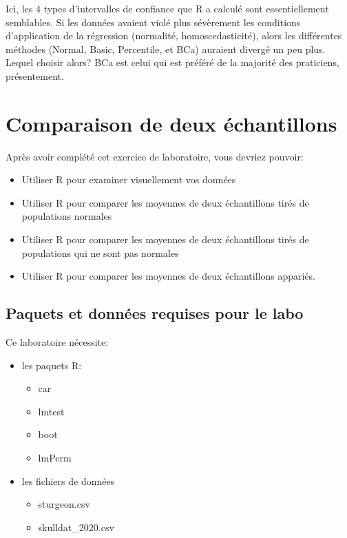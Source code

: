 \documentclass[
  12pt,
]{book}
\providecommand{\tightlist}{%
  \setlength{\itemsep}{0pt}\setlength{\parskip}{0pt}}
\begin{document}
Ici, les 4 types d'intervalles de confiance que R a calculé sont essentiellement semblables. Si les données avaient violé plus sévèrement les conditions d'application de la régression (normalité, homoscedasticité), alors les différentes méthodes (Normal, Basic, Percentile, et BCa) auraient divergé un peu plus. Lequel choisir alors? BCa est celui qui est préféré de la majorité des praticiens, présentement.

\hypertarget{comparaison-de-deux-uxe9chantillons}{%
\chapter{Comparaison de deux échantillons}\label{comparaison-de-deux-uxe9chantillons}}

Après avoir complété cet exercice de laboratoire, vous devriez pouvoir:

\begin{itemize}
\tightlist
\item
  Utiliser R pour examiner visuellement vos données
\item
  Utiliser R pour comparer les moyennes de deux échantillons tirés de populations normales
\item
  Utiliser R pour comparer les moyennes de deux échantillons tirés de populations qui ne sont pas normales
\item
  Utiliser R pour comparer les moyennes de deux échantillons appariés.
\end{itemize}

\hypertarget{set-t}{%
\section{Paquets et données requises pour le labo}\label{set-t}}

Ce laboratoire nécessite:

\begin{itemize}
\tightlist
\item
  les paquets R:

  \begin{itemize}
  \tightlist
  \item
    car
  \item
    lmtest
  \item
    boot
  \item
    lmPerm
  \end{itemize}
\item
  les fichiers de données

  \begin{itemize}
  \tightlist
  \item
    sturgeon.csv
  \item
    skulldat\_2020.csv
  \end{itemize}
\end{itemize}
\end{document}
